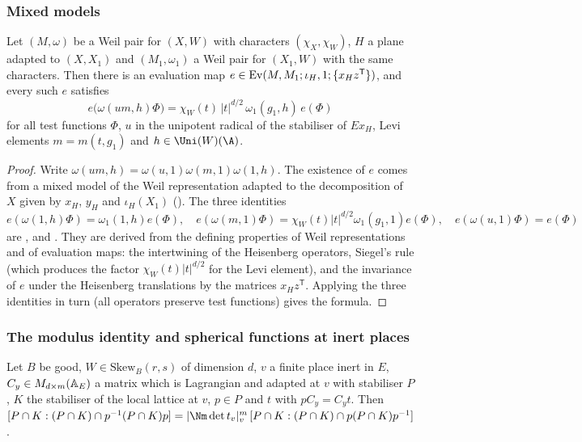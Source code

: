 \subsubsection{Mixed models}\label{sec:pf:thmK:mixx}

\begin{proposition}\label{pf:thmK:mixx}
Let $(M,\omega)$ be a Weil pair for $(X,W)$ with characters $(\chi_X,\chi_W)$, $H$ a plane adapted to $(X,X_1)$ and
$(M_1,\omega_1)$ a Weil pair for $(X_1,W)$ with the same characters. Then there is an evaluation map
$e\in\operatorname{Ev}(M,M_1;\iota_H,1;\{x_Hz^{\mathsf T}\})$, and every such $e$ satisfies
\[
e\bigl(\omega(um,h)\Phi\bigr)=\chi_W(t)\,|t|^{d/2}\,\omega_1(g_1,h)\,e(\Phi)
\]
for all test functions $\Phi$, $u$ in the unipotent radical of the stabiliser of $Ex_H$, Levi elements $m=m(t,g_1)$ and
$h\in\Uni(W)(\A)$.
\end{proposition}

\begin{proof}
Write $\omega(um,h)=\omega(u,1)\omega(m,1)\omega(1,h)$. The existence of $e$ comes from a mixed model of the Weil
representation adapted to the decomposition of $X$ given by $x_H$, $y_H$ and $\iota_H(X_1)$
(). The three identities
\[
e(\omega(1,h)\Phi)=\omega_1(1,h)e(\Phi),\quad e(\omega(m,1)\Phi)=\chi_W(t)|t|^{d/2}\omega_1(g_1,1)e(\Phi),\quad
e(\omega(u,1)\Phi)=e(\Phi)
\]
are ,
 and .
They are derived from the defining properties of Weil representations and of evaluation maps: the intertwining of the
Heisenberg operators, Siegel's rule (which produces the factor $\chi_W(t)|t|^{d/2}$ for the Levi element), and the
invariance of $e$ under the Heisenberg translations by the matrices $x_Hz^{\mathsf T}$. Applying the three identities in
turn (all operators preserve test functions) gives the formula.
\end{proof}

\subsubsection{The modulus identity and spherical functions at inert places}\label{sec:pf:thmK:inert}

\begin{proposition}\label{pf:thmK:modst}
Let $B$ be good, $W\in\mathrm{Skew}_B(r,s)$ of dimension $d$, $v$ a finite place inert in $E$, $C_y\in M_{d\times
m}(\mathbb{A}_E)$ a matrix which is Lagrangian and adapted at $v$ with stabiliser $P$, $K$ the stabiliser of the local lattice
at $v$, $p\in P$ and $t$ with $pC_y=C_yt$. Then $[P\cap K:(P\cap K)\cap p^{-1}(P\cap K)p]=|\Nm\det t_v|_v^{m}\,[P\cap
K:(P\cap K)\cap p(P\cap K)p^{-1}]$.
\end{proposition}

